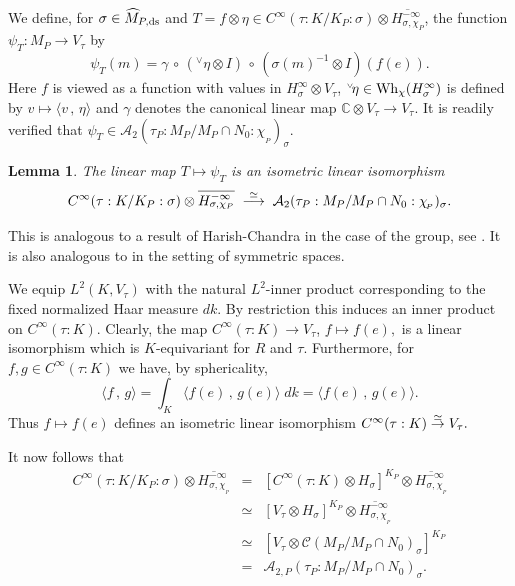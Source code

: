 \documentclass[12pt,a4paper]{article}
\newtheorem{Lemma}[Thm]{Lemma}
\newenvironment{lemma}[0]{\begin{Lemma}\noindent}%
{\end{Lemma}}
\def\proof{\par\noindent{\it Proof.}{\ }{\ }}
\def\medno{\medbreak\noindent}
\def\msy#1{{\mathbb #1}}
\def\C{{\msy C}}
\def\gg{\gamma}
\def\gs{\sigma}
\def\to{\rightarrow}
\def\inp#1#2{\langle#1\,,\,#2\rangle}
\def\after{\,{\scriptstyle\circ}\,}
\def\cA{{\mathcal A}}
\def\cC{{\mathcal C}}
\numberwithin{Thm}{section}
\numberwithin{equation}{section}
\def\Vtau{V_\tau}
\def\Wh{{\rm Wh}}
\numberwithin{equation}{section}
\def\cchiP{\cchi_{{\!}_P} }
\def\MPds{\widehat M_{P,\rm ds}}
\def\cchi{\chi}
\def\gsP{\gs}%
\def\veec{\vee}%
\def\trw{{}^{\scriptscriptstyle\veec}}
\begin{document}
We  define, for $\gs\in \MPds$ and $T = f \otimes \eta \in 
C^\infty(\tau: K/K_P: \gsP) \otimes \overline{ H_{\gs,\chi_P}^{-\infty}}$, the function 
$\psi_{T}: M_P \to V_\tau$ 
by 
\begin{equation}
\label{e: formula for psi T}
\psi_T(m) = \gg \after (\trw\!\eta \otimes I)\after (\gs(m)^{-1} \otimes I)(f(e)).
\end{equation}
Here $f$ is viewed as a function with values in $H_\gs^\infty \otimes V_\tau$,
$\trw\!\eta \in \Wh_\chi(H^\infty_\gs)$ is defined by $v\mapsto \inp{v}{\eta}$ 
and $\gg$ denotes the canonical linear map $\C \otimes \Vtau \to \Vtau.$  
It is readily verified that $\psi_T \in \cA_{2}(\tau_P: M_P/M_P\cap N_0: \cchiP)_\gs.$ 

\begin{lemma}
The linear map  $T \mapsto \psi_T$ is an isometric linear isomorphism
\begin{equation}
\label{e: iso by psi T}
C^\infty(\tau: K/K_P :\gs) \otimes \overline{ H_{\gs, \chi_P}^{-\infty}}\;\;{ \buildrel \simeq \over \longrightarrow}\;\; \cA_{2}(\tau_P: M_P/M_P\cap N_0:  \cchiP)_\gs.
\end{equation}
\end{lemma}
%
This is analogous to a result of Harish-Chandra in the case of the group, see
\cite[Lemmas 7.1, 9.1]{HCha3}. It is also analogous to \cite[Lemma 4.1]{Bps2} in the setting of 
symmetric spaces. 
%
\vspace{-8pt}
\medno
\proof
We equip $L^2(K, \Vtau)$ with the natural $L^2$-inner product corresponding to the 
fixed normalized Haar measure $dk.$ By restriction this induces an inner product 
on $C^\infty(\tau: K).$ Clearly, the map 
$C^\infty(\tau: K) \to V_\tau$, $f \mapsto f(e),$ is 
a linear isomorphism which is $K$-equivariant  for $R$ and $\tau.$ Furthermore,
for $f,g \in C^\infty(\tau: K)$ we have, by sphericality,
$$ 
\inp{f}{g} = \int_K \inp{f(e)}{g(e)}\;dk = \inp{f(e)}{g(e)}.
$$ 
Thus $f \mapsto f(e)$ defines an isometric linear isomorphism $C^\infty(\tau: K) \;{\buildrel \simeq
\over\to} \;V_\tau.$ 

It now follows that 
\begin{eqnarray*}
C^\infty(\tau: K/K_P :\gs) \otimes \overline{ H_{\gs,\cchiP}^{-\infty}}
& = & 
[C^\infty(\tau: K) \otimes H_\gs]^{K_P} \otimes \overline{ H_{\gs,\cchiP}^{-\infty}}\\
&\simeq& [V_\tau \otimes H_\gs]^{K_P}\otimes \overline{ H_{\gs,\cchiP}^{-\infty}}\\
&\simeq & [ V_\tau \otimes \cC(M_P/M_P\cap N_0)_\gs]^{K_P}\\
&= & \cA_{2, P}(\tau_P : M_P/M_P\cap N_0)_\gs.
\end{eqnarray*}
\end{document}
